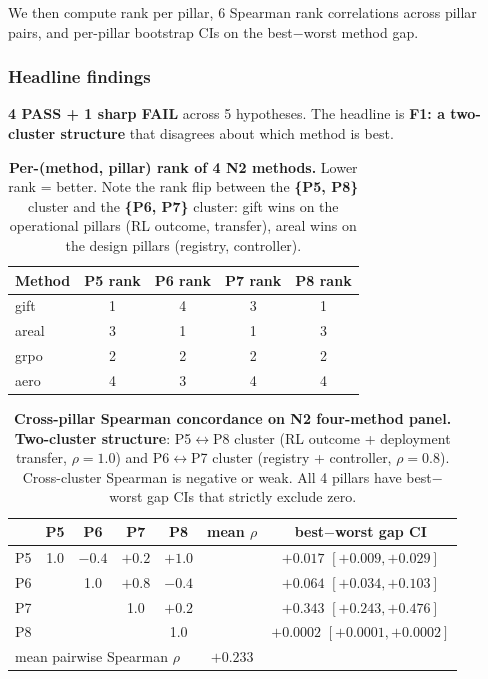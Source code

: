 \documentclass{article}
\begin{document}
We then compute rank per pillar, 6 Spearman rank correlations across
pillar pairs, and per-pillar bootstrap CIs on the best$-$worst method gap.

\subsubsection{Headline findings}\label{sec:synth-iter192-d20-results}
\textbf{4 PASS + 1 sharp FAIL} across 5 hypotheses. The headline is
\textbf{F1: a two-cluster structure} that disagrees about which method
is best.

\begin{table}[h]
\centering
\small
\begin{tabular}{lcccc}
\hline
Method & P5 rank & P6 rank & P7 rank & P8 rank \\
\hline
gift   & 1 & 4 & 3 & 1 \\
areal  & 3 & 1 & 1 & 3 \\
grpo   & 2 & 2 & 2 & 2 \\
aero   & 4 & 3 & 4 & 4 \\
\hline
\end{tabular}
\caption{\textbf{Per-(method, pillar) rank of 4 N2 methods.} Lower rank = better.
Note the rank flip between the \textbf{\{P5, P8\}} cluster and the
\textbf{\{P6, P7\}} cluster: gift wins on the operational pillars (RL
outcome, transfer), areal wins on the design pillars (registry, controller).}
\label{tab:synth-d20-ranks}
\end{table}

\begin{table}[h]
\centering
\small
\begin{tabular}{lcccccc}
\hline
 & P5 & P6 & P7 & P8 & mean $\rho$ & best$-$worst gap CI \\
\hline
P5 & 1.0 & $-0.4$ & $+0.2$ & $\mathbf{+1.0}$ & & $+0.017$ $[+0.009, +0.029]$ \\
P6 &      &  1.0   & $\mathbf{+0.8}$ & $-0.4$ & & $+0.064$ $[+0.034, +0.103]$ \\
P7 &      &        &  1.0   & $+0.2$ & & $+0.343$ $[+0.243, +0.476]$ \\
P8 &      &        &        &  1.0   & & $+0.0002$ $[+0.0001, +0.0002]$ \\
\hline
\multicolumn{5}{l}{mean pairwise Spearman $\rho$} & $+0.233$ & \\
\hline
\end{tabular}
\caption{\textbf{Cross-pillar Spearman concordance on N2 four-method panel.}
\textbf{Two-cluster structure}: P5$\leftrightarrow$P8 cluster (RL outcome +
deployment transfer, $\rho{=}1.0$) and P6$\leftrightarrow$P7 cluster
(registry + controller, $\rho{=}0.8$). Cross-cluster Spearman is negative
or weak. All 4 pillars have best$-$worst gap CIs that strictly exclude zero.}
\label{tab:synth-d20-concordance}
\end{table}
\end{document}
